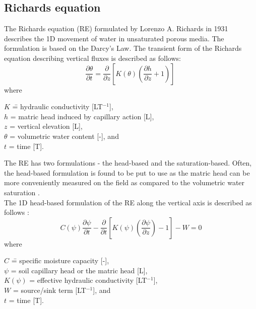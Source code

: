 \subsection{Richards equation}
\label{richards}
The Richards equation (RE) formulated by Lorenzo A. Richards in 1931 describes the 1D movement of water in unsaturated porous media. The formulation is based on the Darcy's Law. The transient form of the Richards equation describing vertical fluxes is described as follows:
\begin{equation} \label{eq:richards_general}
    { {\frac {\partial \theta }{\partial t}}={\frac {\partial }{\partial z}}\left[K(\theta )\left({\frac {\partial h}{\partial z}}+1\right)\right]\ }
\end{equation}
where
\begin{tabbing}
    $K$ \hspace{.4in}\= = hydraulic conductivity [LT$^{-1}$],\\
    $h$ \>= matric head induced by capillary action [L], \\
    $z$ \>= vertical elevation [L], \\
    $\theta$ \>= volumetric water content [-], and \\
    $t$ \>= time [T]. \\
\end{tabbing}
The RE has two formulations - the head-based and the saturation-based. Often, the head-based formulation is found to be put to use as the matric head can be more conveniently measured on the field as compared to the volumetric water saturation \cite{Downer2004}.
\\
The 1D head-based formulation of the RE along the vertical axis is described as follows \cite{Downer2004}:
\begin{equation} \label{eq:richards_head_based}
    C(\psi)\frac{\partial \psi}{\partial t} - \frac{\partial}{\partial t}\left[{K(\psi)\left({\frac{\partial \psi}{\partial z}}\right)-1}\right] - W = 0
\end{equation}
where
\begin{tabbing}
    $C$ \hspace{.4in}\= = speciﬁc moisture capacity [-],\\
    $\psi$ \>= soil capillary head or the matric head [L], \\
    $K(\psi)$ \>= effective hydraulic conductivity [LT$^{-1}$],\\
    $W$ \>= source/sink term [LT$^{-1}$], and \\
    $t$ \>= time [T]. \\
\end{tabbing}

